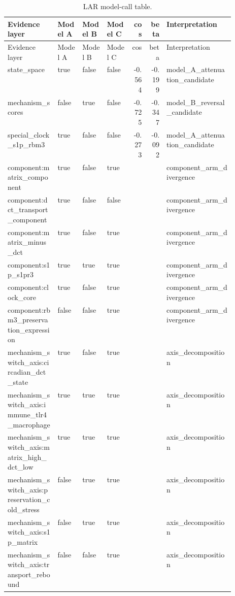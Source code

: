 \documentclass[11pt]{article}
\begin{document}
\begin{landscape}
\scriptsize
\setlength{\tabcolsep}{3pt}
\begin{longtable}{p{0.22\linewidth}lllrrp{0.30\linewidth}}
\caption{LAR model-call table.}\\
\toprule
Evidence layer & Model A & Model B & Model C & cos & beta & Interpretation \\
\midrule
\endfirsthead
\toprule
Evidence layer & Model A & Model B & Model C & cos & beta & Interpretation \\
\midrule
\endhead
state\_space & true & false & false & -0.564 & -0.199 & model\_A\_attenuation\_candidate \\
mechanism\_scores & false & true & false & -0.725 & -0.347 & model\_B\_reversal\_candidate \\
special\_clock\_s1p\_rbm3 & true & false & false & -0.273 & -0.092 & model\_A\_attenuation\_candidate \\
component:matrix\_component & true & false & true &  &  & component\_arm\_divergence \\
component:dct\_transport\_component & true & false & false &  &  & component\_arm\_divergence \\
component:matrix\_minus\_dct & true & false & true &  &  & component\_arm\_divergence \\
component:s1p\_s1pr3 & true & true & true &  &  & component\_arm\_divergence \\
component:clock\_core & true & false & true &  &  & component\_arm\_divergence \\
component:rbm3\_preservation\_expression & false & false & true &  &  & component\_arm\_divergence \\
mechanism\_switch\_axis:circadian\_dct\_state & true & false & true &  &  & axis\_decomposition \\
mechanism\_switch\_axis:immune\_tlr4\_macrophage & true & true & true &  &  & axis\_decomposition \\
mechanism\_switch\_axis:matrix\_high\_dct\_low & true & true & true &  &  & axis\_decomposition \\
mechanism\_switch\_axis:preservation\_cold\_stress & false & true & true &  &  & axis\_decomposition \\
mechanism\_switch\_axis:s1p\_matrix & false & true & true &  &  & axis\_decomposition \\
mechanism\_switch\_axis:transport\_rebound & false & false & true &  &  & axis\_decomposition \\
\bottomrule
\end{longtable}
\normalsize
\end{landscape}
\end{document}

